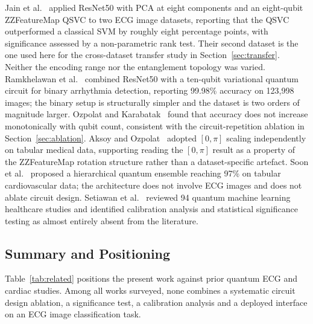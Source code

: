 \documentclass[10pt,conference]{IEEEtran}
\begin{document}
Jain et al.~\cite{jain2025} applied ResNet50 with PCA at eight
components and an eight-qubit ZZFeatureMap QSVC to two ECG image
datasets, reporting that the QSVC outperformed a classical SVM by
roughly eight percentage points, with significance assessed by a
non-parametric rank test. Their second dataset is the one used here for
the cross-dataset transfer study in Section~\ref{sec:transfer}. Neither
the encoding range nor the entanglement topology was varied.
Ramkhelawan et al.~\cite{ramkhelawan2025} combined ResNet50 with a
ten-qubit variational quantum circuit for binary arrhythmia detection,
reporting 99.98\% accuracy on 123,998 images; the binary setup is
structurally simpler and the dataset is two orders of magnitude larger.
Ozpolat and Karabatak~\cite{ozpolat2023} found that accuracy does not
increase monotonically with qubit count, consistent with the
circuit-repetition ablation in Section~\ref{sec:ablation}. Aksoy and
Ozpolat~\cite{aksoy2025} adopted $[0,\pi]$ scaling independently on
tabular medical data, supporting reading the $[0,\pi]$ result as a
property of the ZZFeatureMap rotation structure rather than a
dataset-specific artefact. Soon et al.~\cite{soon2026} proposed a
hierarchical quantum ensemble reaching 97\% on tabular cardiovascular
data; the architecture does not involve ECG images and does not ablate
circuit design. Setiawan et al.~\cite{setiawan2026} reviewed 94
quantum machine learning healthcare studies and identified calibration
analysis and statistical significance testing as almost entirely absent
from the literature.

\subsection{Summary and Positioning}

Table~\ref{tab:related} positions the present work against prior
quantum ECG and cardiac studies. Among all works surveyed, none combines
a systematic circuit design ablation, a significance test, a calibration
analysis and a deployed interface on an ECG image classification task.
\end{document}
